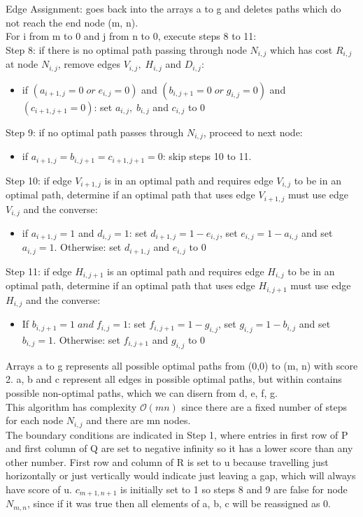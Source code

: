 \documentclass{article}
\begin{document}
	Edge Assignment: goes back into the arrays a to g and deletes paths which do not reach the end node (m, n).\\
	For i from m to 0 and j from n to 0, execute steps 8 to 11:\\
	Step 8: if there is no optimal path passing through node $ N_{i, j} $ which has cost $ R_{i, j} $ at node $ N_{i, j} $, remove edges $V_{i, j}, \; H_{i, j}$ and $ D_{i, j} $:
	\begin{itemize}
		\item if $ (a_{i+1,j} = 0 \; or \; e_{i, j} = 0) $ and $ (b_{i, j+1} = 0 \; or \; g_{i, j} = 0) $ and $ (c_{i+1,j+1} = 0) $: set $ a_{i, j}, \; b_{i, j} $ and $ c_{i, j} $ to 0
	\end{itemize}
	Step 9: if no optimal path passes through $ N_{i, j} $, proceed to next node:
	\begin{itemize}
		\item if $ a_{i+1, j} = b_{i, j+1} = c_{i+1, j+1} = 0 $: skip steps 10 to 11.
	\end{itemize}
	Step 10: if edge $ V_{i+1, j} $ is in an optimal path and requires edge $ V_{i, j} $ to be in an optimal path, determine if an optimal path that uses edge $ V_{i+1, j} $ must use edge $ V_{i, j} $ and the converse:
	\begin{itemize}
		\item if $ a_{i+1, j} = 1 $ and $ d_{i, j} = 1 $: set $ d_{i+1, j} = 1-e_{i, j} $, set $ e_{i, j} = 1-a_{i, j} $ and set $ a_{i, j} = 1 $. Otherwise: set $ d_{i+1, j} $ and $ e_{i, j} $ to 0
	\end{itemize}
	Step 11: if edge $ H_{i, j+1} $ is an optimal path and requires edge $ H_{i, j} $ to be in an optimal path, determine if an optimal path that uses edge $ H_{i, j+1} $ must use edge $ H_{i, j} $ and the converse:
	\begin{itemize}
		\item If $ b_{i, j+1} = 1 \; and \; f_{i, j} = 1 $: set $ f_{i, j+1} = 1-g_{i, j} $, set $ g_{i, j} = 1-b_{i, j} $ and set $ b_{i, j} = 1 $. Otherwise: set $ f_{i, j+1} $ and $ g_{i, j} $ to 0
	\end{itemize}

	Arrays a to g represents all possible optimal paths from (0,0) to (m, n) with score 2. a, b and c represent all edges in possible optimal paths, but within contains possible non-optimal paths, which we can disern from d, e, f, g.\\
	
	This algorithm has complexity $ \mathcal{O}(mn) $ since there are a fixed number of steps for each node $ N_{i, j} $ and there are mn nodes.\\
	The boundary conditions are indicated in Step 1, where entries in first row of P and first column of Q are set to negative infinity so it has a lower score than any other number. First row and column of R is set to u because travelling just horizontally or just vertically would indicate just leaving a gap, which will always have score of u. $ c_{m+1, n+1} $ is initially set to 1 so steps 8 and 9 are false for node $ N_{m, n} $, since if it was true then all elements of a, b, c will be reassigned as 0.
	
\end{document}
